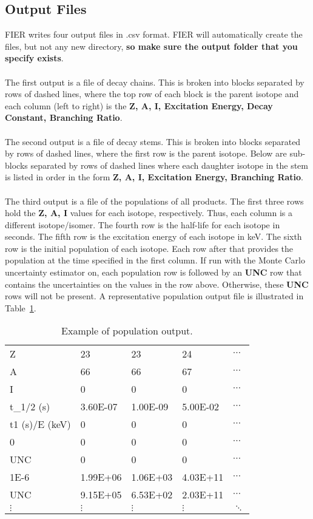 \documentclass{article}
\begin{document}
\begin{appendices}
\section{Output Files}
\label{outputfiles}
FIER writes four output files in .csv format. FIER will automatically create the files, but not any new directory, \textbf{so make sure the output folder that you specify exists}.
\\\\
The first output is a file of decay chains. This is broken into blocks separated by rows of dashed lines, where the top row of each block is the parent isotope and each column (left to right) is the \textbf{Z, A, I, Excitation Energy, Decay Constant, Branching Ratio}.
\\\\
The second output is a file of decay stems. This is broken into blocks separated by rows of dashed lines, where the first row is the parent isotope. Below are sub-blocks separated by rows of dashed lines where each daughter isotope in the stem is listed in order in the form \textbf{Z, A, I, Excitation Energy, Branching Ratio}.
\\\\
The third output is a file of the populations of all products. The first three rows hold the \textbf{Z, A, I} values for each isotope, respectively. Thus, each column is a different isotope/isomer. The fourth row is the half-life for each isotope in seconds. The fifth row is the excitation energy of each isotope in keV. The sixth row is the initial population of each isotope. Each row after that provides the population at the time specified in the first column. If run with the Monte Carlo uncertainty estimator on, each population row is followed by an \textbf{UNC} row that contains the uncertainties on the values in the row above. Otherwise, these \textbf{UNC} rows will not be present. A representative population output file is illustrated in Table~\ref{pops}.

\begin{table}[h]
\centering
\begin{tabular}{lllll}
Z & 23 & 23 & 24 & $\cdots$ \\ 
A & 66 & 66 & 67 & $\cdots$ \\ 
I  & 0 & 0 & 0 & $\cdots$ \\ 
t\_1/2 (s) & 3.60E-07 & 1.00E-09 & 5.00E-02 & $\cdots$ \\ 
t1 (s)/E (keV) & 0 & 0 & 0 & $\cdots$ \\  
0 & 0 & 0 & 0 & $\cdots$ \\ 
UNC & 0 & 0 & 0 & $\cdots$ \\ 
1E-6 & 1.99E+06 & 1.06E+03 & 4.03E+11 & $\cdots$ \\ 
UNC & 9.15E+05 & 6.53E+02 & 2.03E+11 & $\cdots$ \\ 
$\vdots$ & $\vdots$ & $\vdots$ & $\vdots$ & $\ddots$ \\ 
\end{tabular}
\caption{Example of population output.}
\label{pops}
\end{table}


\end{appendices}
\end{document}
